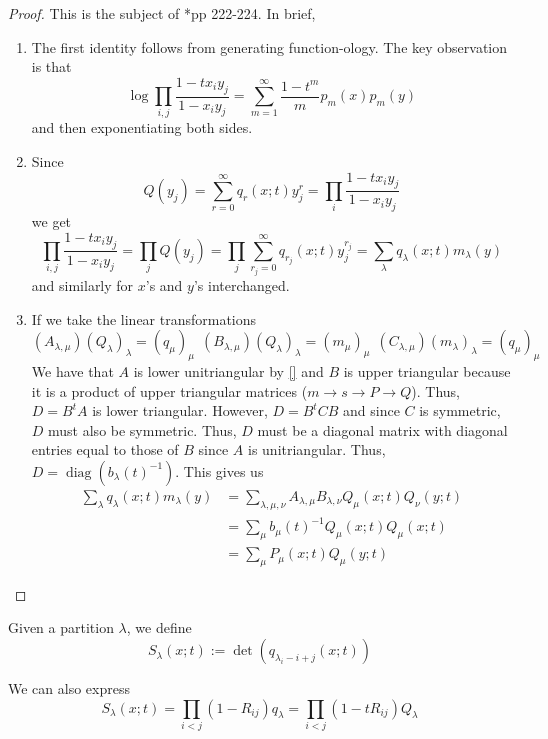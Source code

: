 \documentclass[11pt,leqno,oneside]{amsart}
\numberwithin{thm}{section}
\newcommand{\diag}{\operatorname{diag}}
\begin{document}
\begin{proof}
  This is the subject of \cite{macdonald}*{pp 222-224}. In brief,
  \begin{enumerate}
  \item The first identity follows from generating function-ology. The
    key observation is that \[
      \log \prod_{i,j} \frac{1-t x_i y_j}{1 - x_i y_j} =
      \sum_{m=1}^\infty \frac{1-t^m}{m} p_m(x) p_m(y)
    \]
    and then exponentiating both sides.
  \item Since \[
      Q(y_j) = \sum_{r=0}^\infty q_r(x;t) y_j^r = \prod_i \frac{1-t x_i y_j}{1 - x_i y_j}
    \]
    we get \[
      \prod_{i,j}  \frac{1-t x_i y_j}{1 - x_i y_j} = \prod_j Q(y_j) =
      \prod_j \sum_{r_j = 0}^\infty q_{r_j}(x;t) y_j^{r_j} =
      \sum_\lambda q_\lambda(x;t) m_\lambda(y)
    \]
    and similarly for \(x\)'s and \(y\)'s interchanged.
  \item If we take the linear transformations \[
      (A_{\lambda,\mu})(Q_\lambda)_\lambda = (q_\mu)_\mu \ \
      (B_{\lambda,\mu})(Q_\lambda)_\lambda = (m_\mu)_\mu \ \
      (C_{\lambda,\mu})(m_\lambda)_\lambda = (q_\mu)_\mu
    \]
    We have that \(A\) is lower unitriangular by \ref{} and \(B\) is
    upper triangular because it is a product of upper triangular
    matrices (\(m \to s \to P \to Q\)). Thus, \(D = B^t A\) is lower
    triangular. However, \(D = B^t C B\) and since \(C\) is symmetric,
    \(D\) must also be symmetric. Thus, \(D\) must be a diagonal
    matrix with diagonal entries equal to those of \(B\) since \(A\)
    is unitriangular. Thus, \(D = \diag(b_\lambda(t)^{-1})\). This
    gives us
    \begin{align*}
      \sum_\lambda q_\lambda(x;t) m_\lambda(y)
      & = \sum_{\lambda,\mu,\nu} A_{\lambda,\mu} B_{\lambda,\nu}
        Q_\mu(x;t) Q_\nu(y;t) \\
      & = \sum_\mu b_\mu(t)^{-1} Q_\mu(x;t) Q_\mu(x;t) \\
      & = \sum_\mu P_\mu(x;t) Q_\mu(y;t)
    \end{align*}
  \end{enumerate}
\end{proof}
\begin{defn}
  Given a partition \(\lambda\), we define \[
    S_\lambda(x;t) := \det(q_{\lambda_i-i+j}(x;t))
  \]
\end{defn}
\begin{prop}
  We can also express \[
    S_\lambda(x;t) = \prod_{i < j} (1-R_{ij}) q_\lambda = \prod_{i <
      j} (1-tR_{ij})Q_\lambda
  \]
\end{prop}
\end{document}
